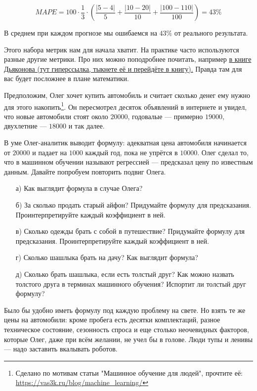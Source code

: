 \documentclass[12pt, a4paper, oneside]{article}
\theoremstyle{plain} %
\theoremstyle{definition}
\newcounter{problem}%
\renewcommand{\theproblem}{\arabic{problem}}
\newenvironment{problem}[1]{
\addtocounter{problem}{1}\noindent{ \color{titleblue} \large \bfseries Упражнение~\theproblem~#1 \vspace{1ex} \newline}
}{ }
\begin{document}
\begin{solution}
\begin{itemize}
$$
MAPE = 100\cdot \frac{1}{3} \cdot\left( \frac{|5 - 4|}{5} + \frac{|10 -20|}{10} + \frac{|100 - 110|}{100} \right) =  43 \% 
$$

В среднем при каждом прогнозе мы ошибаемся на $43\%$ от реального результата. 

Этого набора метрик нам для начала хватит. На практике часто используются разные другие метрики. Про них можно поподробнее почитать, например \href{https://alexanderdyakonov.files.wordpress.com/2018/10/book_08_metrics_12_blog1.pdf}{в книге Дьяконова (тут гиперссылка, тыкнете её и перейдёте в книгу).} Правда там для вас будет посложнее в плане математики.
\end{itemize} 
\end{solution}


\begin{problem}{(как выглядит модель)}
Предположим, Олег хочет купить автомобиль и считает сколько денег ему нужно для этого накопить\footnote{Сделано по мотивам статьи "Машинное обучение для людей", прочтите её: \url{https://vas3k.ru/blog/machine_learning/}}. Он пересмотрел десяток объявлений в интернете и увидел, что новые автомобили стоят около $20 000$, годовалые — примерно $19 000$, двухлетние — $18 000$ и так далее.

В уме Олег-аналитик выводит формулу: адекватная цена автомобиля начинается от $20 000$ и падает на $1000$ каждый год, пока не упрётся в $10 000$. Олег сделал то, что в машинном обучении называют регрессией --- предсказал цену по известным данным. Давайте попробуем повторить подвиг Олега.

\begin{enumerate}
	\item[а)] Как выглядит формула в случае Олега?
	\item[б)] За сколько продать старый айфон? Придумайте формулу для предсказания. Проинтерпретируйте каждый коэффициент в ней. 
	\item[в)] Сколько одежды брать с собой в путешествие?  Придумайте формулу для предсказания. Проинтерпретируйте каждый коэффициент в ней. 
	\item[г)] Сколько шашлыка брать на дачу? Как выглядит формула?
	\item[д)] Сколько брать шашлыка, если есть толстый друг? Как можно назвать толстого друга в терминах машинного обучения? Испортит ли толстый друг формулу?
\end{enumerate}

Было бы удобно иметь формулу под каждую проблему на свете. Но взять те же цены на автомобили: кроме пробега есть десятки комплектаций, разное техническое состояние, сезонность спроса и еще столько неочевидных факторов, которые Олег, даже при всём желании, не учел бы в голове. Люди тупы и ленивы — надо заставить вкалывать роботов.
\end{problem}
\end{document}
